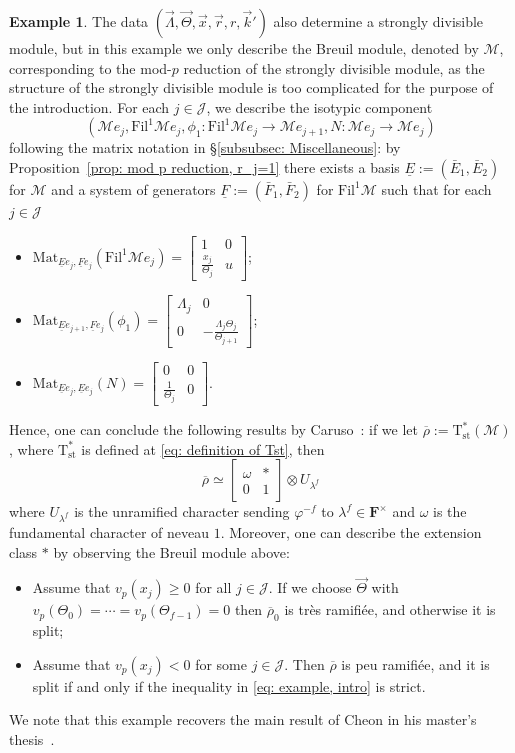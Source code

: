 \documentclass[11pt]{amsart}
\theoremstyle{definition}
\numberwithin{equation}{subsection}
\theoremstyle{plain}
\theoremstyle{plain}
\theoremstyle{plain}
\theoremstyle{plain}
\theoremstyle{plain}
\theoremstyle{plain}
\theoremstyle{plain}
\theoremstyle{plain}
\theoremstyle{plain}
\theoremstyle{plain}
\theoremstyle{plain}
\theoremstyle{plain}
\theoremstyle{definition}
\theoremstyle{definition}
\theoremstyle{definition}
\newtheorem{exam}[equation]{Example}
\theoremstyle{remark}
\renewcommand{\(}{\textup{(}}
\renewcommand{\)}{\textup{)}}
\newcommand{\F}{\mathbf{F}}
\newcommand{\Tst}{\mathrm{T}_{\mathrm{st}}}
\newcommand{\rhobar}{\overline{\rho}}
\newcommand{\cM}{\mathcal{M}}
\newcommand{\Fil}{\mathrm{Fil}}
\newcommand{\cJ}{\mathcal{J}}
\newcommand{\vx}{\vec{x}}
\newcommand{\vr}{\vec{r}}
\newcommand{\vk}{\vec{k}}
\newcommand{\vLam}{\vec{\Lambda}}
\newcommand{\vTh}{\vec{\Theta}}
\begin{document}
\begin{exam}
The data $(\vLam,\vTh,\vx,\vr,r,\vk')$ also determine a strongly divisible module, but in this example we only describe the Breuil module, denoted by $\cM$, corresponding to the mod-$p$ reduction of the strongly divisible module, as the structure of the strongly divisible module is too complicated for the purpose of the introduction. For each $j\in\cJ$, we describe the isotypic component $$(\cM e_j,\Fil^1\cM e_j,\phi_1:\Fil^1\cM e_j\rightarrow \cM e_{j+1},N:\cM e_j\rightarrow \cM e_j)$$ following the matrix notation in \S\ref{subsubsec: Miscellaneous}: by Proposition~\ref{prop: mod p reduction, r_j=1} there exists a basis $\underline{E}:=(\bar{E}_1,\bar{E}_2)$ for $\cM$ and a system of generators $\underline{F}:=(\bar{F}_1,\bar{F}_2)$ for $\Fil^1\cM$ such that for each $j\in\cJ$
\begin{itemize}[leftmargin=*]
\item $\mathrm{Mat}_{\underline{E}e_j,\underline{F}e_j}(\Fil^1\cM e_j)=
\begin{bmatrix}
1 & 0 \\ \frac{x_j}{\Theta_j} & u 
\end{bmatrix}$;
\item $\mathrm{Mat}_{\underline{E}e_{j+1},\underline{F}e_j}(\phi_1)=
\begin{bmatrix}
\Lambda_j & 0 \\ 0 & -\tfrac{\Lambda_j\Theta_j}{\Theta_{j+1}}
\end{bmatrix}$;
\item $\mathrm{Mat}_{\underline{E}e_j,\underline{E}e_j}(N)=
\begin{bmatrix}
0 & 0 \\ \frac{1}{\Theta_j} & 0
\end{bmatrix}$.
\end{itemize}
Hence, one can conclude the following results by Caruso~\cite{Caruso}: if we let $\rhobar:=\Tst^\ast(\cM)$, where $\Tst^\ast$ is defined at \eqref{eq: definition of Tst}, then 
$$\rhobar\simeq
\begin{bmatrix}
  \omega & \ast \\
  0 & 1 
\end{bmatrix}\otimes U_{\lambda^f}$$
where $U_{\lambda^f}$ is the unramified character sending $\varphi^{-f}$ to $\lambda^f\in\F^{\times}$ and $\omega$ is the fundamental character of neveau $1$. Moreover, one can describe the extension class $\ast$ by observing the Breuil module above:
\begin{itemize}[leftmargin=*]
\item Assume that $v_p(x_j)\geq 0$ for all $j\in\cJ$. If we choose $\vTh$ with $v_p(\Theta_0)=\cdots=v_p(\Theta_{f-1})=0$ then $\rhobar_0$ is tr\`es ramifi\'ee, and otherwise it is split;
\item Assume that $v_p(x_j)<0$ for some $j\in\cJ$. Then $\rhobar$ is peu ramifi\'ee, and it is split if and only if the inequality in \eqref{eq: example, intro} is strict.
\end{itemize}
We note that this example recovers the main result of Cheon in his master's thesis~\cite{Cheon}.
\end{exam}
\end{document}
